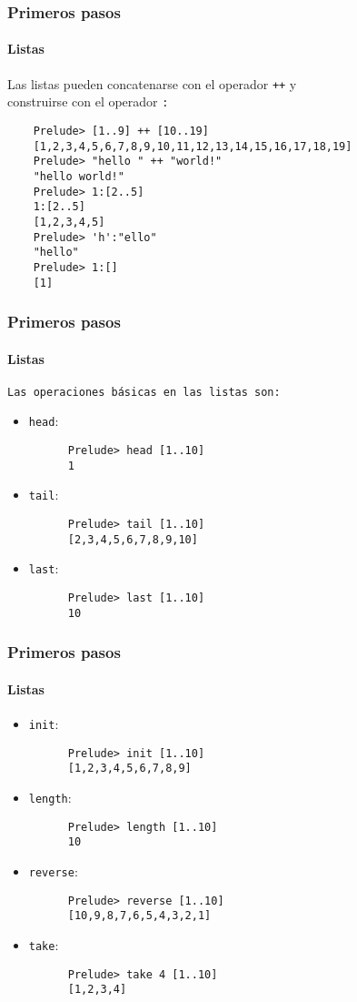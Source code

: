 \documentclass{beamer}
\begin{document}
\begin{frame}[fragile]
  \frametitle{Primeros pasos}
  \framesubtitle{Listas}
  Las listas pueden concatenarse con el operador \verb~++~ y\\construirse con el operador \verb~:~
  \begin{verbatim}
    Prelude> [1..9] ++ [10..19]
    [1,2,3,4,5,6,7,8,9,10,11,12,13,14,15,16,17,18,19]
    Prelude> "hello " ++ "world!"
    "hello world!"
    Prelude> 1:[2..5]
    1:[2..5]
    [1,2,3,4,5]
    Prelude> 'h':"ello"
    "hello"
    Prelude> 1:[]
    [1]
  \end{verbatim}
\end{frame}

\begin{frame}[fragile]
  \frametitle{Primeros pasos}
  \framesubtitle{Listas}
  \texttt{Las operaciones básicas en las listas son:}
  \begin{itemize}
  \item \verb~head~:
    \begin{verbatim}
      Prelude> head [1..10]
      1
    \end{verbatim}
  \item \verb~tail~:
    \begin{verbatim}
      Prelude> tail [1..10]
      [2,3,4,5,6,7,8,9,10]
    \end{verbatim}
  \item \verb~last~:
    \begin{verbatim}
      Prelude> last [1..10]
      10
    \end{verbatim}
  \end{itemize}
\end{frame}

\begin{frame}[fragile]
  \frametitle{Primeros pasos}
  \framesubtitle{Listas}
  \begin{itemize}
  \item \verb~init~:
    \begin{verbatim}
      Prelude> init [1..10]
      [1,2,3,4,5,6,7,8,9]
    \end{verbatim}
  \item \verb~length~:
    \begin{verbatim}
      Prelude> length [1..10]
      10
    \end{verbatim}
  \item \verb~reverse~:
    \begin{verbatim}
      Prelude> reverse [1..10]
      [10,9,8,7,6,5,4,3,2,1]
    \end{verbatim}
  \item \verb~take~:
    \begin{verbatim}
      Prelude> take 4 [1..10]
      [1,2,3,4]
    \end{verbatim}
  \end{itemize}
\end{frame}
\end{document}
